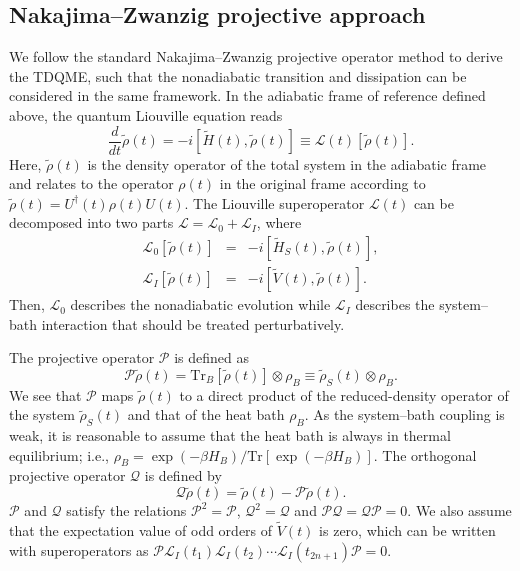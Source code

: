 \documentclass[english,nofootinbib, pra, twocolumn,superscriptaddress]{revtex4-1}
\begin{document}
\subsection{Nakajima--Zwanzig projective approach}

We follow the standard Nakajima--Zwanzig projective operator method
\citep{2007.Petruccione} to derive the TDQME, such that the nonadiabatic
transition and dissipation can be considered in the same framework.
In the adiabatic frame of reference defined above, the quantum Liouville
equation reads 
\begin{equation}
\frac{d}{dt}\tilde{\rho}(t)=-i[\tilde{H}(t),\tilde{\rho}(t)]\equiv\mathcal{L}(t)[\tilde{\rho}(t)].\label{eq:Liouville}
\end{equation}
Here, $\tilde{\rho}(t)$ is the density operator of the total system
in the adiabatic frame and relates to the operator $\rho(t)$ in the
original frame according to $\tilde{\rho}(t)=U^{\dagger}(t)\rho(t)U(t)$. The
Liouville superoperator $\mathcal{L}(t)$ can be decomposed into two
parts $\mathcal{L}=\mathcal{L}_{\text{0}}+\mathcal{L}_{I}$, where
\begin{eqnarray}
\mathcal{L}_{\text{0}}[\tilde{\rho}(t)] & = & -i[\tilde{H}_{S}(t),\tilde{\rho}(t)],\label{eq:Lnon}\\
\mathcal{L}_{I}[\tilde{\rho}(t)] & = & -i[\tilde{V}(t),\tilde{\rho}(t)].
\end{eqnarray}
Then, $\mathcal{L}_{\text{0}}$ describes the nonadiabatic evolution while $\mathcal{L}_{I}$ describes the system--bath interaction that should be treated perturbatively.

The projective operator $\mathcal{P}$ is defined as 
\begin{equation}
\mathcal{P}\tilde{\rho}(t)=\mbox{Tr}_{B}[\tilde{\rho}(t)]\otimes\rho_{B}\equiv\tilde{\rho}_{S}(t)\otimes\rho_{B}.\label{eq:P}
\end{equation}
We see that $\mathcal{P}$ maps $\tilde{\rho}(t)$ to a direct product of
the reduced-density operator of the system $\tilde{\rho}_{S}(t)$ and that of the 
heat bath $\rho_{B}$. As the system--bath coupling is weak, it is
reasonable to assume that the heat bath is always in thermal equilibrium; i.e., $\rho_{B}=\exp(-\beta H_{B})/\text{Tr}[\exp(-\beta H_{B})]$. The orthogonal projective operator $\mathcal{Q}$ is defined by 
\begin{equation}
\mathcal{Q}\tilde{\rho}(t)=\tilde{\rho}(t)-\mathcal{P}\tilde{\rho}(t).\label{eq:Q}
\end{equation}
$\mathcal{P}$ and $\mathcal{Q}$ satisfy the relations $\mathcal{P}^{2}=\mathcal{P}$,
$\mathcal{Q}^{2}=\mathcal{Q}$ and $\mathcal{P}\mathcal{Q}=\mathcal{Q}\mathcal{P}=0$.
We also assume that the expectation value of odd orders of $\tilde{V}(t)$
is zero, which can be written with superoperators as $
\mathcal{P}\mathcal{L}_{I}(t_{1})\mathcal{L}_{I}(t_{2})\cdots\mathcal{L}_{I}(t_{2n+1})\mathcal{P}=0.$
\end{document}
